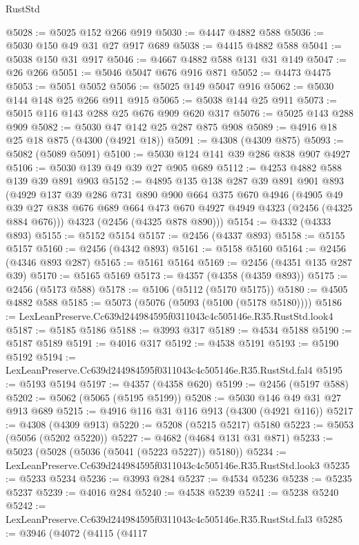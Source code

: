 \begin{lexlean}{RustStd}
\begin{coremodule}
@5028 := @5025 @152 @266 @919
@5030 := @4447 @4882 @588
@5036 := @5030 @150 @49 @31 @27 @917 @689
@5038 := @4415 @4882 @588
@5041 := @5038 @150 @31 @917
@5046 := @4667 @4882 @588 @131 @31 @149
@5047 := @26 @266
@5051 := @5046 @5047 @676 @916 @871
@5052 := @4473 @4475
@5053 := @5051 @5052
@5056 := @5025 @149 @5047 @916
@5062 := @5030 @144 @148 @25 @266 @911 @915
@5065 := @5038 @144 @25 @911
@5073 := @5015 @116 @143 @288 @25 @676 @909 @620 @317
@5076 := @5025 @143 @288 @909
@5082 := @5030 @47 @142 @25 @287 @875 @908
@5089 := @4916 @18 @25 @18 @875 (@4300 (@4921 @18))
@5091 := @4308 (@4309 @875)
@5093 := @5082 (@5089 @5091)
@5100 := @5030 @124 @141 @39 @286 @838 @907 @4927
@5106 := @5030 @139 @49 @39 @27 @905 @689
@5112 := @4253 @4882 @588 @139 @39 @891 @903
@5152 := @4895
    @135
    @138
    @287
    @39
    @891
    @901
    @893
    (@4929
      @137
      @39
      @286
      @731
      @890
      @900
      @664
      @375
      @670
      @4946
      (@4905 @49 @39 @27 @838 @676 @689 @664 @473 @670 @4927 @4949 @4323 (@2456 (@4325 @884 @676)))
      @4323
      (@2456 (@4325 @878 @890)))
@5154 := @4332 (@4333 @893)
@5155 := @5152 @5154
@5157 := @2456 (@4337 @893)
@5158 := @5155 @5157
@5160 := @2456 (@4342 @893)
@5161 := @5158 @5160
@5164 := @2456 (@4346 @893 @287)
@5165 := @5161 @5164
@5169 := @2456 (@4351 @135 @287 @39)
@5170 := @5165 @5169
@5173 := @4357 (@4358 (@4359 @893))
@5175 := @2456 (@5173 @588)
@5178 := @5106 (@5112 (@5170 @5175))
@5180 := @4505 @4882 @588
@5185 := @5073 (@5076 (@5093 (@5100 (@5178 @5180))))
@5186 := LexLeanPreserve.Cc639d244984595f0311043c4c505146e.R35.RustStd.look4
@5187 := @5185 @5186
@5188 := @3993 @317
@5189 := @4534 @5188
@5190 := @5187 @5189
@5191 := @4016 @317
@5192 := @4538 @5191
@5193 := @5190 @5192
@5194 := LexLeanPreserve.Cc639d244984595f0311043c4c505146e.R35.RustStd.fal4
@5195 := @5193 @5194
@5197 := @4357 (@4358 @620)
@5199 := @2456 (@5197 @588)
@5202 := @5062 (@5065 (@5195 @5199))
@5208 := @5030 @146 @49 @31 @27 @913 @689
@5215 := @4916 @116 @31 @116 @913 (@4300 (@4921 @116))
@5217 := @4308 (@4309 @913)
@5220 := @5208 (@5215 @5217) @5180
@5223 := @5053 (@5056 (@5202 @5220))
@5227 := @4682 (@4684 @131 @31 @871)
@5233 := @5023 (@5028 (@5036 (@5041 (@5223 @5227)) @5180))
@5234 := LexLeanPreserve.Cc639d244984595f0311043c4c505146e.R35.RustStd.look3
@5235 := @5233 @5234
@5236 := @3993 @284
@5237 := @4534 @5236
@5238 := @5235 @5237
@5239 := @4016 @284
@5240 := @4538 @5239
@5241 := @5238 @5240
@5242 := LexLeanPreserve.Cc639d244984595f0311043c4c505146e.R35.RustStd.fal3
@5285 := @3946
    (@4072
      (@4115
        (@4117

\end{coremodule}
\end{lexlean}

